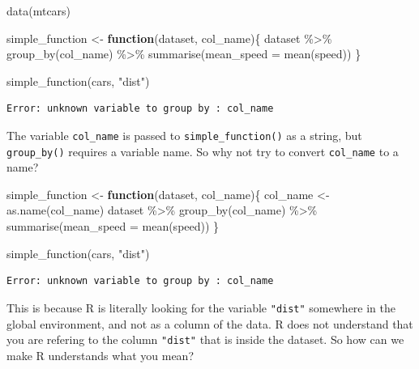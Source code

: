 \documentclass[
]{article}
\newenvironment{Shaded}{\begin{snugshade}}{\end{snugshade}}
\newcommand{\AttributeTok}[1]{\textcolor[rgb]{0.77,0.63,0.00}{#1}}
\newcommand{\ControlFlowTok}[1]{\textcolor[rgb]{0.13,0.29,0.53}{\textbf{#1}}}
\newcommand{\FunctionTok}[1]{\textcolor[rgb]{0.00,0.00,0.00}{#1}}
\newcommand{\NormalTok}[1]{#1}
\newcommand{\OtherTok}[1]{\textcolor[rgb]{0.56,0.35,0.01}{#1}}
\newcommand{\SpecialCharTok}[1]{\textcolor[rgb]{0.00,0.00,0.00}{#1}}
\newcommand{\StringTok}[1]{\textcolor[rgb]{0.31,0.60,0.02}{#1}}
\begin{document}
\begin{Shaded}
\begin{Highlighting}[]
\FunctionTok{data}\NormalTok{(mtcars)}

\NormalTok{simple\_function }\OtherTok{\textless{}{-}} \ControlFlowTok{function}\NormalTok{(dataset, col\_name)\{}
\NormalTok{  dataset }\SpecialCharTok{\%\textgreater{}\%}
    \FunctionTok{group\_by}\NormalTok{(col\_name) }\SpecialCharTok{\%\textgreater{}\%}
    \FunctionTok{summarise}\NormalTok{(}\AttributeTok{mean\_speed =} \FunctionTok{mean}\NormalTok{(speed))}
\NormalTok{\}}


\FunctionTok{simple\_function}\NormalTok{(cars, }\StringTok{"dist"}\NormalTok{)}
\end{Highlighting}
\end{Shaded}

\begin{verbatim}
Error: unknown variable to group by : col_name
\end{verbatim}

The variable \texttt{col\_name} is passed to \texttt{simple\_function()} as a string, but \texttt{group\_by()} requires a
variable name. So why not try to convert \texttt{col\_name} to a name?

\begin{Shaded}
\begin{Highlighting}[]
\NormalTok{simple\_function }\OtherTok{\textless{}{-}} \ControlFlowTok{function}\NormalTok{(dataset, col\_name)\{}
\NormalTok{  col\_name }\OtherTok{\textless{}{-}} \FunctionTok{as.name}\NormalTok{(col\_name)}
\NormalTok{  dataset }\SpecialCharTok{\%\textgreater{}\%}
    \FunctionTok{group\_by}\NormalTok{(col\_name) }\SpecialCharTok{\%\textgreater{}\%}
    \FunctionTok{summarise}\NormalTok{(}\AttributeTok{mean\_speed =} \FunctionTok{mean}\NormalTok{(speed))}
\NormalTok{\}}


\FunctionTok{simple\_function}\NormalTok{(cars, }\StringTok{"dist"}\NormalTok{)}
\end{Highlighting}
\end{Shaded}

\begin{verbatim}
Error: unknown variable to group by : col_name
\end{verbatim}

This is because R is literally looking for the variable \texttt{"dist"} somewhere in the global
environment, and not as a column of the data. R does not understand that you are refering to the
column \texttt{"dist"} that is inside the dataset. So how can we make R understands what you mean?
\end{document}

